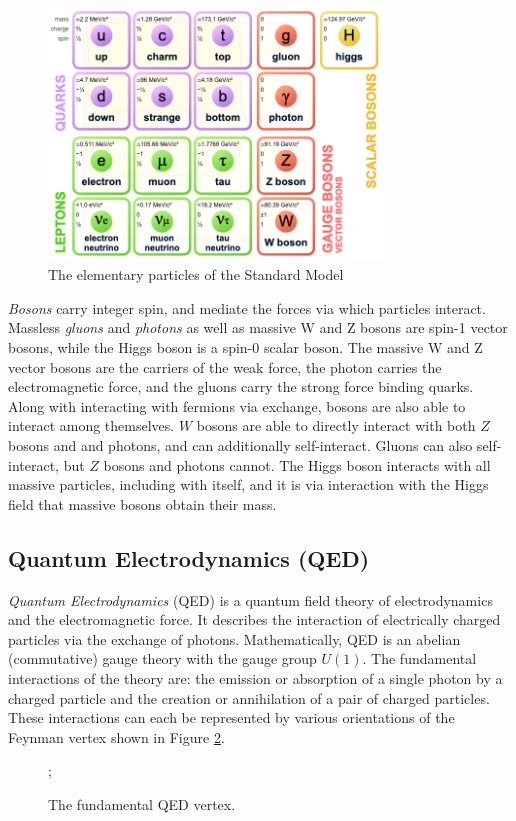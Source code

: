 \begin{figure}[h]
    \centering
    \includegraphics[width=0.8\textwidth]{Figures/1/sm.png}
    \caption{The elementary particles of the Standard Model}
    \label{fig:standardmodel}
\end{figure}

\textit{Bosons} carry integer spin, and mediate the forces via which particles interact. Massless \textit{gluons} and \textit{photons} as well as massive W and Z bosons are spin-1 vector bosons, while the Higgs boson is a spin-0 scalar boson. The massive W and Z vector bosons are the carriers of the weak force, the photon carries the electromagnetic force, and the gluons carry the strong force binding quarks. Along with interacting with fermions via exchange, bosons are also able to interact among themselves. $W$ bosons are able to directly interact with both $Z$ bosons and and photons, and can additionally self-interact. Gluons can also self-interact, but $Z$ bosons and photons cannot. The Higgs boson interacts with all massive particles, including with itself, and it is via interaction with the Higgs field that massive bosons obtain their mass.

\subsection{Quantum Electrodynamics (QED)}
\textit{Quantum Electrodynamics} (QED) \cite{Feynman, schwartz, peskin} is a quantum field theory of electrodynamics and the electromagnetic force. It describes the interaction of electrically charged particles via the exchange of photons. Mathematically, QED is an abelian (commutative) gauge theory with the gauge group $U(1)$. The fundamental interactions of the theory are: the emission or absorption of a single photon by a charged particle and the creation or annihilation of a pair of charged particles. These interactions can each be represented by various orientations of the Feynman vertex shown in Figure \ref{fig:QEDvertex}.
\begin{figure}[h!]
    \centering
    ;
    \caption{The fundamental QED vertex.}
    \label{fig:QEDvertex}
\end{figure}

